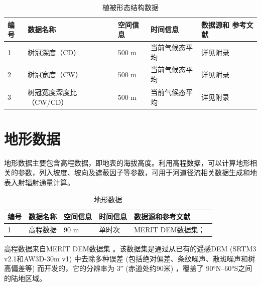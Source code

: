 \begin{table}[htbp]
  \begin{threeparttable}
    \centering
    \caption{植被形态结构数据}
    \label{tab:植被形态结构数据}
    \begin{tabular}{p{1cm}p{4.5cm}p{2cm}p{3cm}p{3cm}}
      \toprule
      编号 & 数据名称                & 空间信息 & 时间信息       & 数据源和 \newline 参考文献 \\
      \midrule
      1    & 树冠深度（CD）          & 500 m    & 当前气候态平均 & 详见附录                   \\
      2    & 树冠宽度（CW）          & 500 m    & 当前气候态平均 & 详见附录                   \\
      3    & 树冠宽度深度比（CW/CD） & 500 m    & 当前气候态平均 & 详见附录                   \\
      \bottomrule
    \end{tabular}
  \end{threeparttable}
\end{table}



\section{地形数据}

地形数据主要包含高程数据，即地表的海拔高度。利用高程数据，可以计算地形相关的参数，列入坡度、坡向及遮蔽因子等参数，可用于河道径流相关数据生成和地表入射辐射通量计算。

\begin{table}[htbp]
  \begin{threeparttable}
    \centering
    \caption{地形数据}
    \label{tab:地形数据}
    \begin{tabular}{p{1cm}p{3.5cm}p{2cm}p{3cm}p{4cm}}
      \toprule
      编号 & 数据名称 & 空间信息 & 时间信息 & 数据源和参考文献                          \\
      \midrule
      1    & 高程数据 & 90 m     & 单时次   & MERIT DEM数据集；~\cite{yamazaki2017high} \\
      \bottomrule
    \end{tabular}
  \end{threeparttable}
\end{table}

高程数据来自MERIT DEM数据集 \citep{yamazaki2017high}。该数据集是通过从已有的遥感DEM (SRTM3 v2.1和AW3D-30m v1) 中去除多种误差 (包括绝对偏差、条纹噪声、散斑噪声和树高偏差等) 而开发的，它的分辨率为 \ang{;;3} (赤道处约90米) ，覆盖了 \ang{90;;}N--\ang{60;;}S之间的陆地区域。



